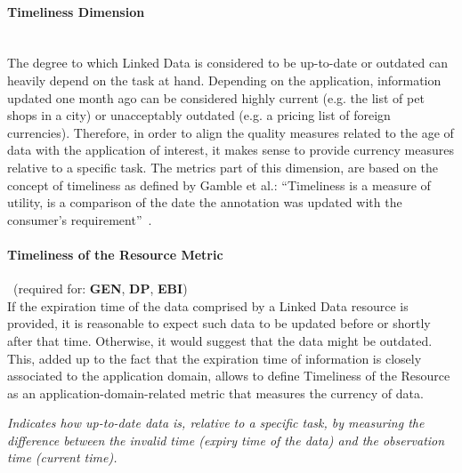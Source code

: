 
\paragraph{Timeliness Dimension}~\\ %
The degree to which Linked Data is considered to be up-to-date or outdated can heavily depend on the task at hand. Depending on the application, information updated one month ago can be considered highly current (e.g. the list of pet shops in a city) or unacceptably outdated (e.g. a pricing list of foreign currencies). Therefore, in order to align the quality measures related to the age of data with the application of interest, it makes sense to provide currency measures relative to a specific task. The metrics part of this dimension, are based on the concept of timeliness as defined by Gamble et al.: ``Timeliness is a measure of utility, is a comparison of the date the annotation was updated with the consumer's requirement''~\cite{Gamble2011}.

\paragraph{Timeliness of the Resource Metric}~(required for: \textbf{GEN}, \textbf{DP}, \textbf{EBI})~\\ %
If the expiration time of the data comprised by a Linked Data resource is provided, it is reasonable to expect such data to be updated before or shortly after that time. Otherwise, it would suggest that the data might be outdated. This, added up to the fact that the expiration time of information is closely associated to the application domain, allows to define Timeliness of the Resource as an application-domain-related metric that measures the currency of data.
\begin{mdframed}[style=metricdefinition]
\emph{Indicates how up-to-date data is, relative to a specific task, by measuring the difference between the invalid time (expiry time of the data) and the observation time (current time).}
\end{mdframed}

